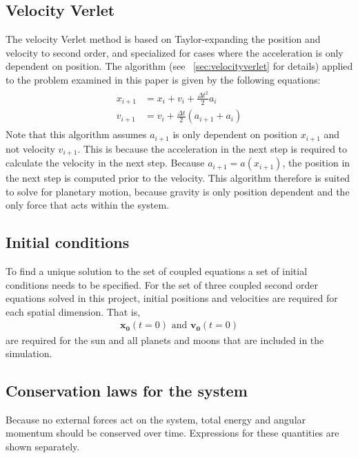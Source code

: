 \documentclass[aps,reprint]{revtex4-1}
\begin{document}
\subsection{Velocity Verlet}
The velocity Verlet method is based on Taylor-expanding the position and velocity
to second order, and specialized for cases where the acceleration is only
dependent on position. The algorithm (see ~\ref{sec:velocityverlet} for details)
applied to the problem examined in this paper is given by the following equations:
\begin{align}
  \begin{split}
    x_{i+1} &= x_i + v_i + \frac{\Delta{t}^2}{2} a_i \\
    v_{i+1} &= v_i + \frac{\Delta{t}}{2}(a_{i+1} + a_{i})
  \end{split}
\end{align}
Note that this algorithm assumes $a_{i+1}$ is only dependent on position $x_{i+1}$
and not velocity $v_{i+1}$. This is because the acceleration in the next step
is required to calculate the velocity in the next step. Because $a_{i+1} = a(x_{i+1})$,
the position in the next step is computed prior to the velocity. This algorithm
therefore is suited to solve for planetary motion, because gravity is only
position dependent and the only force that acts within the system.

\subsection{Initial conditions}
To find a unique solution to the set of coupled equations a set of initial conditions needs
to be specified. For the set of three coupled second order equations solved in this project,
initial positions and velocities are required for each spatial dimension. That is,
\begin{align*}
 \mathbf{x_0}(t = 0) \text{ and } \mathbf{v_0}(t = 0)
\end{align*}
are required for the sun and all planets and moons that are included in the simulation.

\subsection{Conservation laws for the system}
Because no external forces act on the system, total energy and angular momentum should
be conserved over time. Expressions for these quantities are shown separately.
\end{document}
